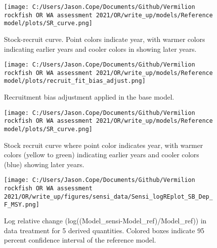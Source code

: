 \documentclass[11pt,
  english,
  a4paper,
]{article}
\begin{document}
\begin{figure}
\centering
\texttt{[image: C:/Users/Jason.Cope/Documents/Github/Vermilion rockfish OR WA assessment 2021/OR/write\_up/models/Reference model/plots/SR\_curve.png]}
\caption{Stock-recruit curve. Point colors indicate year, with warmer colors indicating earlier years and cooler colors in showing later years.\label{fig:bh-curve}}
\end{figure}

\tagmcend\tagstructend


\begin{figure}
\centering
\texttt{[image: C:/Users/Jason.Cope/Documents/Github/Vermilion rockfish OR WA assessment 2021/OR/write\_up/models/Reference model/plots/recruit\_fit\_bias\_adjust.png]}
\caption{Recruitment bias adjustment applied in the base model.\label{fig:bias-adj}}
\end{figure}

\tagmcend\tagstructend


\begin{figure}
\centering
\texttt{[image: C:/Users/Jason.Cope/Documents/Github/Vermilion rockfish OR WA assessment 2021/OR/write\_up/models/Reference model/plots/SR\_curve.png]}
\caption{Stock recruit curve where point color indicates year, with warmer colors (yellow to green) indicating earlier years and cooler colors (blue) showing later years.\label{fig:sr-curve}}
\end{figure}

\tagmcend\tagstructend


\begin{figure}
\centering
\texttt{[image: C:/Users/Jason.Cope/Documents/Github/Vermilion rockfish OR WA assessment 2021/OR/write\_up/figures/sensi\_data/Sensi\_logREplot\_SB\_Dep\_F\_MSY.png]}
\caption{Log relative change (log((Model\_sensi-Model\_ref)/Model\_ref)) in data treatment for 5 derived quantities. Colored boxes indicate 95 percent confidence interval of the reference model.\label{fig:sensi-data-RE}}
\end{figure}
\end{document}

